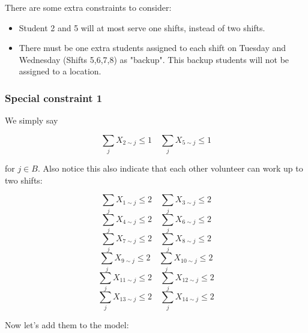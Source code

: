\documentclass[11pt]{article}
\providecommand{\tightlist}{%
      \setlength{\itemsep}{0pt}\setlength{\parskip}{0pt}}
\begin{document}
There are some extra constraints to consider:

\begin{itemize}
\tightlist
\item
  Student 2 and 5 will at most serve one shifts, instead of two shifts.
\item
  There must be one extra students assigned to each shift on Tuesday and
  Wednesday (Shifts 5,6,7,8) as "backup". This backup students will not
  be assigned to a location.
\end{itemize}

\subsubsection{Special constraint 1}\label{special-constraint-1}

We simply say

\[ \sum_{j} X_{2\sim j}  \leq 1  \quad \sum_{j} X_{5\sim j}  \leq 1\]

for \(j\in B\). Also notice this also indicate that each other volunteer
can work up to two shifts:

\[ \sum_{j} X_{1\sim j}  \leq 2  \quad \sum_{j} X_{3\sim j}  \leq 2\]
\[ \sum_{j} X_{4\sim j}  \leq 2  \quad \sum_{j} X_{6\sim j}  \leq 2\]
\[ \sum_{j} X_{7\sim j}  \leq 2  \quad \sum_{j} X_{8\sim j}  \leq 2\]
\[ \sum_{j} X_{9\sim j}  \leq 2  \quad \sum_{j} X_{10\sim j}  \leq 2\]
\[ \sum_{j} X_{11\sim j}  \leq 2  \quad \sum_{j} X_{12\sim j}  \leq 2\]
\[ \sum_{j} X_{13\sim j}  \leq 2  \quad \sum_{j} X_{14\sim j}  \leq 2\]

Now let's add them to the model:
\end{document}
